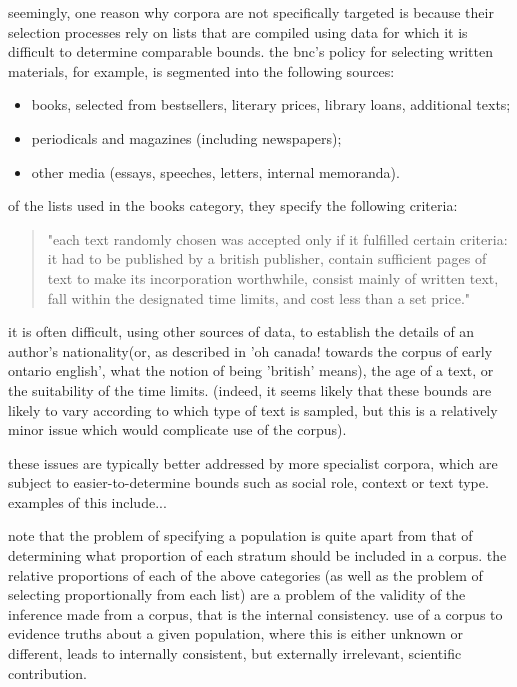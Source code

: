 seemingly, one reason why corpora are not specifically targeted is because their selection processes rely on lists that are compiled using data for which it is difficult to determine comparable bounds.  the bnc's policy for selecting written materials, for example, is segmented into the following sources:

\begin{itemize}
 \item books, selected from bestsellers, literary prices, library loans, additional texts;
 \item periodicals and magazines (including newspapers);
 \item other media (essays, speeches, letters, internal memoranda).
\end{itemize}

of the lists used in the books category, they specify the following criteria:

\begin{quotation}
"each text randomly chosen was accepted only if it fulfilled certain criteria: it had to be published by a british publisher, contain sufficient pages of text to make its incorporation worthwhile, consist mainly of written text, fall within the designated time limits, and cost less than a set price."
\end{quotation}

it is often difficult, using other sources of data, to establish the details of an author's nationality(or, as described in 'oh canada! towards the corpus of early ontario english', what the notion of being 'british' means), the age of a text, or the suitability of the time limits.  (indeed, it seems likely that these bounds are likely to vary according to which type of text is sampled, but this is a relatively minor issue which would complicate use of the corpus).

these issues are typically better addressed by more specialist corpora, which are subject to easier-to-determine bounds such as social role, context or text type.  examples of this include...


note that the problem of specifying a population is quite apart from that of determining what proportion of each stratum should be included in a corpus.  the relative proportions of each of the above categories (as well as the problem of selecting proportionally from each list) are a problem of the validity of the inference made from a corpus, that is the internal consistency.  use of a corpus to evidence truths about a given population, where this is either unknown or different, leads to internally consistent, but externally irrelevant, scientific contribution.

